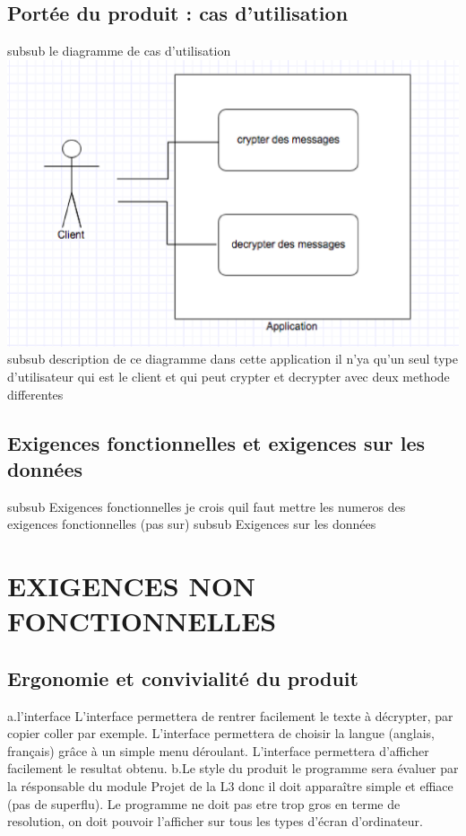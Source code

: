 \documentclass[a4]{article}
\begin{document}
		\subsection{Portée du produit : cas d’utilisation}
			subsub le diagramme de cas d'utilisation \\
				\includegraphics[scale=0.5]{dia.eps} \\
			subsub description de ce diagramme
				dans cette application il n'ya qu'un seul type d'utilisateur qui est le client 
				et qui peut crypter et decrypter avec deux methode differentes
		\subsection{Exigences fonctionnelles et exigences sur les données}
			subsub Exigences fonctionnelles
				je crois quil faut mettre les numeros des exigences fonctionnelles (pas sur)
			subsub Exigences sur les données 
	\section{EXIGENCES NON FONCTIONNELLES}
		\subsection{Ergonomie et convivialité du produit}
a.l'interface
L'interface permettera de rentrer facilement le texte à décrypter, par copier coller par exemple.
L'interface permettera de choisir la langue (anglais, français) grâce à un simple menu déroulant.
L'interface permettera d'afficher facilement le resultat obtenu.
b.Le style du produit
le programme sera évaluer par la résponsable du module Projet de la L3 donc il doit apparaître simple et effiace (pas de superflu).
Le programme ne doit pas etre trop gros en terme de resolution, on doit pouvoir l'afficher sur tous les types d'écran d'ordinateur.
\end{document}
